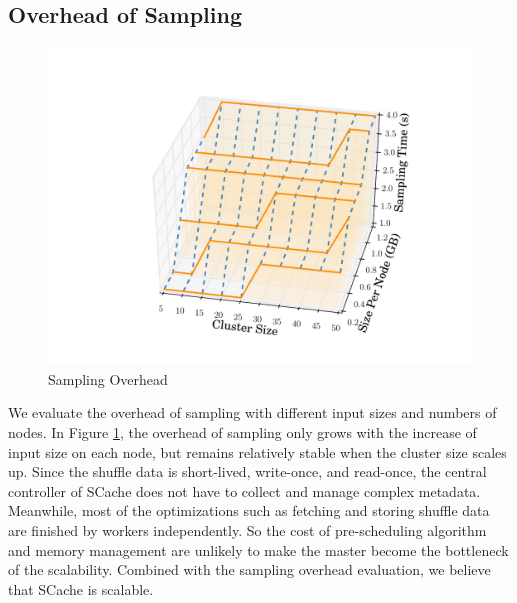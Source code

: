 \subsection{Overhead of Sampling}
\ifrevision
\reversemarginpar
{}
\fi
\begin{figure}
	\centering
	\includegraphics[width=0.6\linewidth]{fig/sampling}
	\caption{Sampling Overhead}
	\label{fig:sampling}
	\vspace{-1em}
\end{figure}
We evaluate the overhead of sampling with different input sizes and numbers of nodes. 
In Figure \ref{fig:sampling}, the overhead of sampling only grows with the increase of input size on each node, but remains relatively stable when the cluster size scales up.
Since the shuffle data is short-lived, write-once, and read-once, the central controller of SCache does not have to collect and manage complex metadata. 
Meanwhile, most of the optimizations such as fetching and storing shuffle data are finished by workers independently. 
So the cost of pre-scheduling algorithm and memory management are unlikely to make the master become the bottleneck of the scalability.
Combined with the sampling overhead evaluation, we believe that SCache is scalable.
